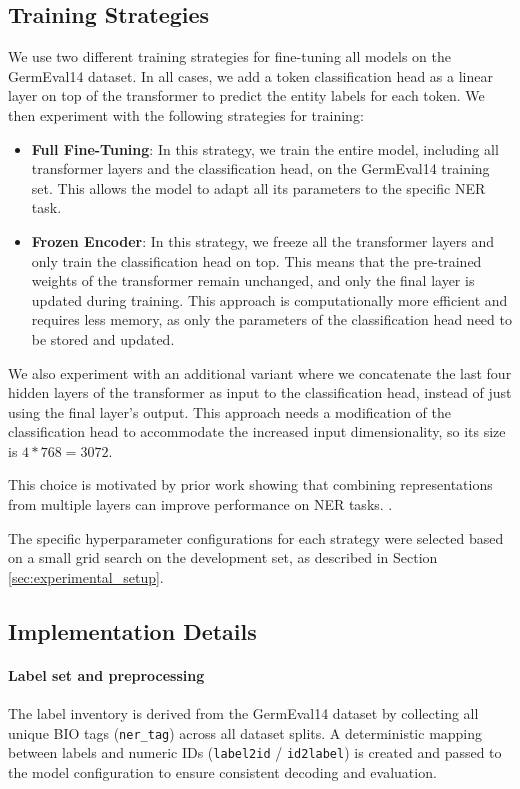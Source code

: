 \documentclass[11pt,a4paper,twocolumn]{article}
\begin{document}
\subsection{Training Strategies}
We use two different training strategies for fine-tuning all models on the GermEval14 dataset. In all cases, we add a token classification head as a linear layer on top of the transformer to predict the entity labels for each token. We then experiment with the following strategies for training:
\begin{itemize}
    \item \textbf{Full Fine-Tuning}: In this strategy, we train the entire model, including all transformer layers and the classification head, on the GermEval14 training set. This allows the model to adapt all its parameters to the specific NER task.
    \item \textbf{Frozen Encoder}: In this strategy, we freeze all the transformer layers and only train the classification head on top. This means that the pre-trained weights of the transformer remain unchanged, and only the final layer is updated during training. This approach is computationally more efficient and requires less memory, as only the parameters of the classification head need to be stored and updated.
\end{itemize}
We also experiment with an additional variant where we concatenate the last four hidden layers of the transformer as input to the classification head, instead of just using the final layer's output. This approach needs a modification of the classification head to accommodate the increased input dimensionality, so its size is $4 * 768 = 3072$.

This choice is motivated by prior work showing that combining representations from multiple layers can improve performance on NER tasks. \cite{tamburini_solving_2024}.

The specific hyperparameter configurations for each strategy were selected based on a small grid search on the development set, as described in Section \ref{sec:experimental_setup}.

\subsection{Implementation Details}
\paragraph{Label set and preprocessing}
The label inventory is derived from the GermEval14 dataset by collecting all unique BIO tags (\texttt{ner\_tag}) across all dataset splits. A deterministic mapping between labels and numeric IDs (\texttt{label2id} / \texttt{id2label}) is created and passed to the model configuration to ensure consistent decoding and evaluation.
\end{document}
